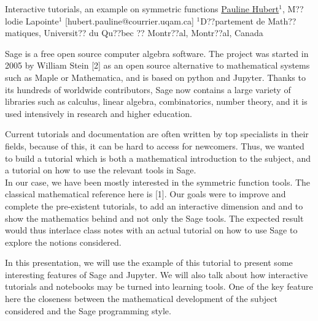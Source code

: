 


\begin{abstract_online}{Interactive tutorials, an example on symmetric functions}{%
        \underline{Pauline Hubert}$^{1}$, M??lodie Lapointe$^{1}$ }{[hubert.pauline@courrier.uqam.ca]
        }{%
        $^1$D??partement de Math??matiques, Universit?? du Qu??bec ?? Montr??al, Montr??al, Canada}
    
Sage is a free open source computer algebra software. The project was started in 2005 by William Stein [2] as an open source alternative to mathematical systems such as Maple or Mathematica, and is based on python and Jupyter. Thanks to its hundreds of worldwide contributors, Sage now contains a large variety of libraries such as calculus, linear algebra, combinatorics, number theory, and it is used intensively in research and higher education. 

Current tutorials and documentation are often written by top specialists in their fields, because of this, it can be hard to access for newcomers. Thus, we wanted to build a tutorial which is both a mathematical introduction to the subject, and a tutorial on how to use the relevant tools in Sage. \\
In our case, we have been mostly interested in the symmetric function tools. The classical mathematical reference here is [1]. Our goals were to improve and complete the pre-existent tutorials, to add an interactive dimension and and to show the mathematics behind and not only the Sage tools. The expected result would thus interlace class notes with an actual tutorial on how to use Sage to explore the notions considered.

In this presentation, we will use the example of this tutorial to present some interesting features of Sage and Jupyter. We will also talk about how interactive tutorials and notebooks may be turned into learning tools.
One of the key feature here the closeness between the mathematical development of the subject considered and the Sage programming style. \\



\end{abstract_online}
